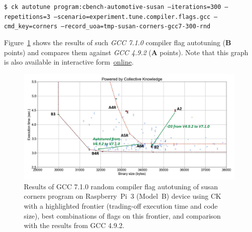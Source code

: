 \begin{flushleft}
\texttt{\$ ck autotune program:cbench-automotive-susan --iterations=300 --repetitions=3 
  --scenario=experiment.tune.compiler.flags.gcc
  --cmd\_key=corners --record\_uoa=tmp-susan-corners-gcc7-300-rnd}
\end{flushleft}

Figure~\ref{fig:autotuning-susan-gcc7} shows the results of such \textit{GCC 7.1.0}
compiler flag autotuning (\textbf{B} points) and compares them 
against \textit{GCC 4.9.2} (\textbf{A} points).
%
Note that this graph is also available in interactive form~\href{http://cknowledge.org/repo/web.php?wcid=graph:96fd8e4c8394b1bc&subgraph=rpi3-autotuning-susan-gcc7-interactive}{online}.

   \begin{figure}[]
     \centering
      \includegraphics[width=6.9in]
      {ck-assets/9e4b1594d3b99443-cropped.pdf} %
      \vspace{0.1in}
      \vspace{0.1in}
     \caption{
      Results of GCC 7.1.0 random compiler flag autotuning of susan corners program on Raspberry~Pi~3 (Model~B) 
      device using CK with a highlighted frontier (trading-off execution time and code size), 
      best combinations of flags on this frontier, and comparison with the results from GCC 4.9.2.
     }
     \label{fig:autotuning-susan-gcc7}
   \end{figure}

